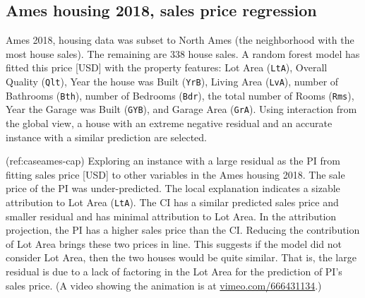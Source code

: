 \documentclass[
]{article}
\begin{document}
\hypertarget{ames-housing-2018-sales-price-regression}{%
\subsection{Ames housing 2018, sales price
regression}\label{ames-housing-2018-sales-price-regression}}

Ames 2018, housing data was subset to North Ames (the neighborhood with
the most house sales). The remaining are 338 house sales. A random
forest model has fitted this price {[}USD{]} with the property features:
Lot Area (\texttt{LtA}), Overall Quality (\texttt{Qlt}), Year the house
was Built (\texttt{YrB}), Living Area (\texttt{LvA}), number of
Bathrooms (\texttt{Bth}), number of Bedrooms (\texttt{Bdr}), the total
number of Rooms (\texttt{Rms}), Year the Garage was Built
(\texttt{GYB}), and Garage Area (\texttt{GrA}). Using interaction from
the global view, a house with an extreme negative residual and an
accurate instance with a similar prediction are selected.

(ref:caseames-cap) Exploring an instance with a large residual as the PI
from fitting sales price {[}USD{]} to other variables in the Ames
housing 2018. The sale price of the PI was under-predicted. The local
explanation indicates a sizable attribution to Lot Area (\texttt{LtA}).
The CI has a similar predicted sales price and smaller residual and has
minimal attribution to Lot Area. In the attribution projection, the PI
has a higher sales price than the CI. Reducing the contribution of Lot
Area brings these two prices in line. This suggests if the model did not
consider Lot Area, then the two houses would be quite similar. That is,
the large residual is due to a lack of factoring in the Lot Area for the
prediction of PI's sales price. (A video showing the animation is at
\href{https://vimeo.com/666431134}{vimeo.com/666431134}.)
\end{document}
